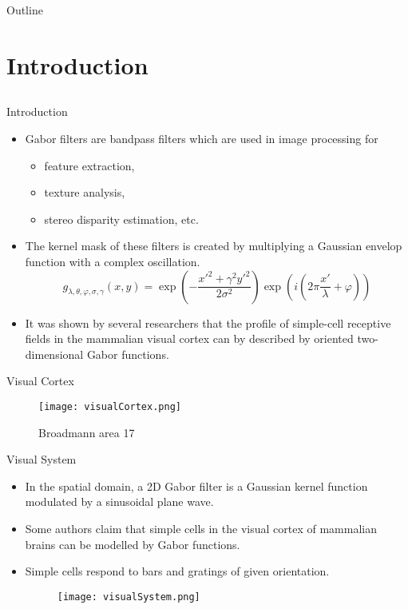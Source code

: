 \begin{frame}[label=4]{Outline}
\tableofcontents
\note{}
\end{frame}

\section{Introduction}
\subsection{}
\begin{frame}{Introduction}
\begin{itemize}
\item Gabor filters are bandpass filters which are used in image processing for
\begin{itemize}
\item feature extraction,
\item texture analysis,
\item stereo disparity estimation, etc.
\end{itemize}   
\item The kernel  mask of these filters is created by multiplying a Gaussian envelop function with a complex oscillation.
\begin{equation}
{g_{\lambda ,\theta ,\varphi ,\sigma ,\gamma }}(x,y) = \exp \left( { - \frac{{x{'^2} + {\gamma ^2}y{'^2}}}{{2{\sigma ^2}}}} \right)\exp \left( i\left({2\pi \frac{{x'}}{\lambda } + \varphi }\right) \right)\nonumber
\end{equation}
\item It was shown by several researchers that the profile of simple-cell receptive fields in the mammalian visual cortex can by described by oriented two-dimensional Gabor functions.
\end{itemize}
\end{frame}

\begin{frame}{Visual Cortex}
\begin{figure}
\texttt{[image: visualCortex.png]}
\caption{Broadmann area 17~}
\end{figure}
\end{frame}

\begin{frame}{Visual System}
\begin{itemize}
\item In the spatial domain, a 2D Gabor filter is a Gaussian kernel function modulated by a sinusoidal plane wave. 
\item Some authors claim that simple cells in the visual cortex of mammalian brains can be modelled by Gabor functions.
\item Simple cells respond to bars and gratings of given
orientation.
\begin{figure}
\texttt{[image: visualSystem.png]}
\end{figure}
\end{itemize}
\end{frame}


